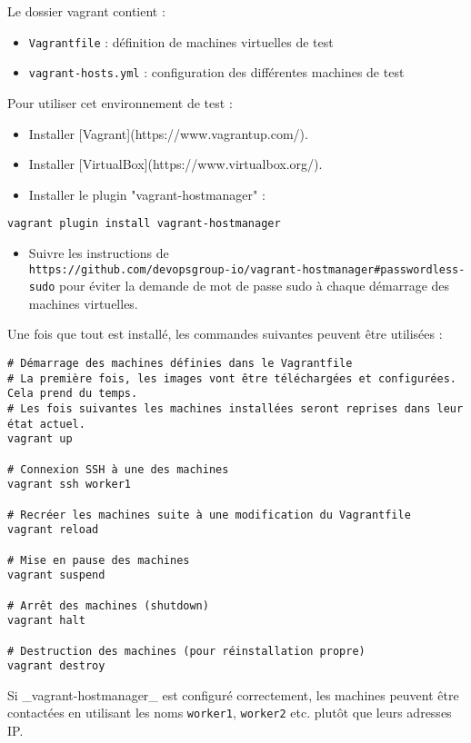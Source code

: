 \documentclass[a4paper,oneside,12pt]{article}
\begin{document}
Le dossier vagrant contient :
\begin{itemize}
	\item  \verb!Vagrantfile! : définition de machines virtuelles de test
	\item  \verb!vagrant-hosts.yml! : configuration des différentes machines de test
\end{itemize}

Pour utiliser cet environnement de test :

\begin{itemize}
\item Installer [Vagrant](https://www.vagrantup.com/).
\item Installer [VirtualBox](https://www.virtualbox.org/).
\item Installer le plugin "vagrant-hostmanager" :
\end{itemize}

\begin{verbatim}
vagrant plugin install vagrant-hostmanager
\end{verbatim}

\begin{itemize}
\item Suivre les instructions de \\
	\texttt{https://github.com/devopsgroup-io/vagrant-hostmanager\#passwordless-sudo} pour éviter la demande de mot de passe sudo à chaque démarrage des machines virtuelles.
\end{itemize}
Une fois que tout est installé, les commandes suivantes peuvent être utilisées :

\begin{verbatim}
# Démarrage des machines définies dans le Vagrantfile
# La première fois, les images vont être téléchargées et configurées. Cela prend du temps.
# Les fois suivantes les machines installées seront reprises dans leur état actuel.
vagrant up

# Connexion SSH à une des machines
vagrant ssh worker1

# Recréer les machines suite à une modification du Vagrantfile
vagrant reload

# Mise en pause des machines
vagrant suspend

# Arrêt des machines (shutdown)
vagrant halt

# Destruction des machines (pour réinstallation propre)
vagrant destroy
\end{verbatim}

Si \_vagrant-hostmanager\_ est configuré correctement, les machines peuvent être contactées en utilisant les noms \verb!worker1!, \verb!worker2! etc. plutôt que leurs adresses IP.
\end{document}
